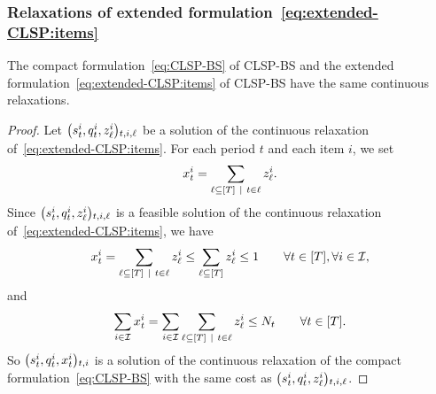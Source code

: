 \subsubsection{Relaxations of extended formulation~\eqref{eq:extended-CLSP:items}}



\begin{prop}\label{prop:extended-relaxation:items}
The compact formulation~\eqref{eq:CLSP-BS} of CLSP-BS and the extended formulation~\eqref{eq:extended-CLSP:items} of CLSP-BS have the same continuous relaxations.
\end{prop}



\begin{proof}
Let $\bracket{\inventory_t^i, \quantity_t^i, z_{\ell}^i}_{t,i,\ell}$ be a solution of the continuous relaxation of~\eqref{eq:extended-CLSP:items}.
For each period $t$ and each item $i$, we set
\begin{equation}
  \setup_t^i=\sum_{\ell\subseteq\range{\horizon}~|~t\in\ell} z_{\ell}^i.
\end{equation}
Since $\bracket{\inventory_t^i, \quantity_t^i, z_{\ell}^i}_{t,i,\ell}$ is a feasible solution of the continuous relaxation of~\eqref{eq:extended-CLSP:items}, we have
\begin{equation}
\setup_t^i
= \sum_{\ell\subseteq\range{\horizon}~|~t\in\ell} z_{\ell}^i
\le \sum_{\ell\subseteq\range{\horizon}} z_{\ell}^i
\le 1
\qquad \forall t\in\range{\horizon},\forall i\in\REF,
\end{equation}
and
\begin{equation}
\sum_{i\in\REF}\setup_t^i
= \sum_{i\in\REF}\sum_{\ell\subseteq\range{\horizon}~|~t\in\ell} z_{\ell}^i
\le \nbsetups_t
\qquad \forall t\in\range{\horizon}.
\end{equation}
So $\bracket{\inventory_t^i, \quantity_t^i, \setup_t^i}_{t,i}$  is a solution of the continuous relaxation of the compact formulation~\eqref{eq:CLSP-BS} with the same cost as $\bracket{\inventory_t^i, \quantity_t^i, z_{\ell}^i}_{t,i,\ell}$.



\end{proof}
